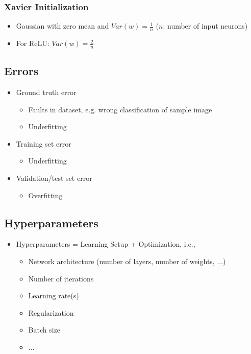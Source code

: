 \documentclass[10pt,a4paper]{article}
\begin{document}
\subsubsection{Xavier Initialization}
\begin{itemize}
	\item Gaussian with zero mean and $Var(w) = \frac 1 n$ ($n$: number of input neurons)
	\item For ReLU: $Var(w) = \frac 2 n$
\end{itemize}

\subsection{Errors}
\begin{itemize}
	\item Ground truth error
	\begin{itemize}
		\item Faults in dataset, e.g. wrong classification of sample image
		\item Underfitting
	\end{itemize}
	\item Training set error
	\begin{itemize}
		\item Underfitting
	\end{itemize}
	\item Validation/test set error
	\begin{itemize}
		\item Overfitting
	\end{itemize}
\end{itemize}

\subsection{Hyperparameters}
\begin{itemize}
	\item Hyperparameters = Learning Setup + Optimization, i.e.,
	\begin{itemize}
		\item Network architecture (number of layers, number of weights, ...)
		\item Number of iterations
		\item Learning rate(s)
		\item Regularization
		\item Batch size
		\item ...
	\end{itemize}
\end{itemize}
\end{document}
